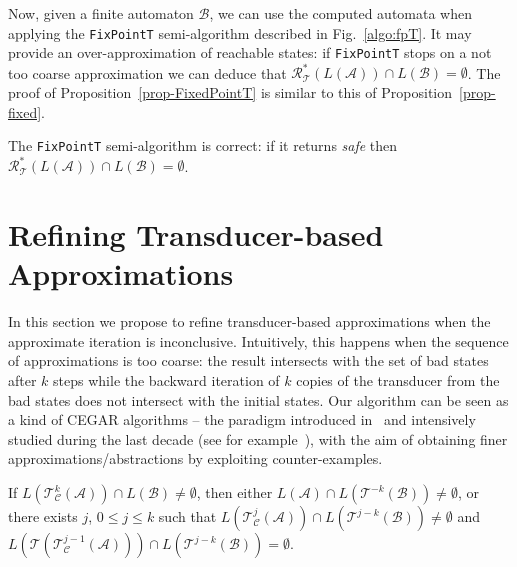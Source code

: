 \documentclass[]{llncs}
\def \A {\mathcal{A}}
\def \T {\mathcal{T}}
\def \R {\mathcal{R}}
\def \B {\mathcal{B}}
\def \C {\mathcal{C}}
\begin{document}
Now, given a finite automaton $\B$, we can use the computed automata
when applying the {\tt FixPointT} semi-algorithm described in
Fig.~\ref{algo:fpT}. It may provide an over-approximation of reachable
states: if {\tt FixPointT} stops on a not too coarse approximation we
can deduce that \hbox{$\R^*_\T(L(\A))\cap L(\B)=\emptyset$}. The proof
of Proposition~\ref{prop-FixedPointT} is similar to this of
Proposition~\ref{prop-fixed}.



\begin{proposition}\label{prop-FixedPointT}
The {\tt FixPointT} semi-algorithm  is correct: if it returns {\it safe}
then $\R^*_\T(L(\A))\cap L(\B)=\emptyset$.
\end{proposition}

\section{Refining Transducer-based Approximations}
\label{transducer-based-approximations-CEGAR}

In this section we propose to refine transducer-based approximations when the approximate iteration is inconclusive. 
Intuitively, this happens when the sequence of approximations is too coarse: the result intersects with the set of bad states after $k$ steps while the backward iteration of $k$ copies of the transducer from the bad states does not intersect with the initial states.
Our algorithm can be seen as a kind of CEGAR algorithms -- the paradigm introduced in~\cite{DBLP:conf/cav/ClarkeGJLV00} and intensively studied during the last decade (see for
example~\cite{bouajjani_abstract_2004,DBLP:conf/rta/BoichutCHK08}), with the aim of obtaining finer approximations/abstractions by exploiting counter-examples.


\begin{proposition}\label{prop-raff1}
If $L(\T^{k}_\C(\A))\cap L(\B)\neq\emptyset$, then either $L(\A)\cap
L(\T^{-k}(\B))\neq\emptyset$, or there exists $j$, $0\leq j\leq k$ such that
$L(\T^{j}_\C(\A))\cap L(\T^{j-k}(\B))\neq\emptyset$ and $L(\T(\T^{j-1}_\C(\A)))\cap
L(\T^{j-k}(\B))=\emptyset$.
\end{proposition}
\end{document}

